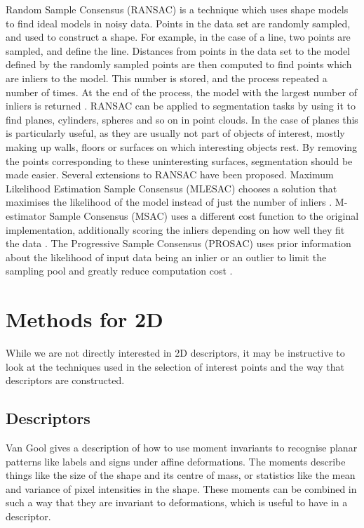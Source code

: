 \documentclass[10pt,a4paper]{article}
\begin{document}
Random Sample Consensus (RANSAC) is a technique which uses shape models to find
ideal models in noisy data. Points in the data set are randomly sampled, and
used to construct a shape. For example, in the case of a line, two points are
sampled, and define the line. Distances from points in the data set to the model
defined by the randomly sampled points are then computed to find points which
are inliers to the model. This number is stored, and the process repeated a
number of times. At the end of the process, the model with the largest number of
inliers is returned \cite{fischler1981random}. RANSAC can be applied to
segmentation tasks by using it to find planes, cylinders, spheres and so on in
point clouds. In the case of planes this is particularly useful, as they are
usually not part of objects of interest, mostly making up walls, floors or
surfaces on which interesting objects rest. By removing the points corresponding
to these uninteresting surfaces, segmentation should be made easier. Several
extensions to RANSAC have been proposed. Maximum Likelihood Estimation Sample
Consensus (MLESAC) chooses a solution that maximises the likelihood of the model
instead of just the number of inliers \cite{torr2000mlesac}. M-estimator Sample
Consensus (MSAC) uses a different cost function to the original implementation,
additionally scoring the inliers depending on how well they fit the data
\cite{torr2000mlesac}. The Progressive Sample Consensus (PROSAC) uses prior
information about the likelihood of input data being an inlier or an outlier to
limit the sampling pool and greatly reduce computation cost
\cite{chum2005matching}.


\section{Methods for 2D}
While we are not directly interested in 2D descriptors, it may be instructive to
look at the techniques used in the selection of interest points and the way that
descriptors are constructed.
\subsection{Descriptors}
Van Gool \cite{van1996affine} gives a description of how to use moment
invariants to recognise planar patterns like labels and signs under affine
deformations. The moments describe things like the size of the shape and its centre
of mass, or statistics like the mean and variance of pixel intensities in the
shape. These moments can be combined in such a way that they are invariant to
deformations, which is useful to have in a descriptor.
\end{document}
